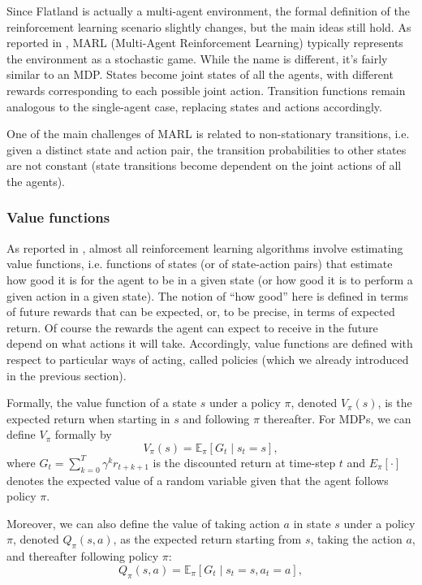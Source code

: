 \documentclass[a4paper,10pt]{report}
\begin{document}
Since Flatland is actually a multi-agent environment, the formal definition of the reinforcement learning scenario slightly changes, but the main ideas still hold. As reported in \cite{marl-medium}, MARL (Multi-Agent Reinforcement Learning) typically represents the environment as a stochastic game. While the name is different, it’s fairly similar to an MDP. States become joint states of all the agents, with different rewards corresponding to each possible joint action. Transition functions remain analogous to the single-agent case, replacing states and actions accordingly. 

One of the main challenges of MARL is related to non-stationary transitions, i.e. given a distinct state and action pair, the transition probabilities to other states are not constant (state transitions become dependent on the joint actions of all the agents).

\subsubsection*{Value functions}
As reported in \cite{sutton-barto}, almost all reinforcement learning algorithms involve estimating value functions, i.e. functions of states (or of state-action pairs) that estimate how good it is for the agent to be in a given state (or how good it is to perform a given action in a given state). The notion of “how good” here is defined in terms of future rewards that can be expected, or, to be precise, in terms of expected return. Of course the rewards the agent can expect to receive in the future depend on what actions it will take. Accordingly, value functions are defined with respect to particular ways of acting, called policies (which we already introduced in the previous section).

Formally, the value function of a state $s$ under a policy $\pi$, denoted $V_\pi(s)$, is the expected return when starting in $s$ and following $\pi$ thereafter. For MDPs, we can define $V_\pi$ formally by
$$
V_\pi(s) = \mathbb{E}_\pi\left[G_t\mid s_t=s\right],
$$
where $G_t=\sum_{k=0}^{T}\gamma^{k}r_{t+k+1}$ is the discounted return at time-step $t$ and $E_\pi[\cdot]$ denotes the expected value of a random variable given that the agent follows policy $\pi$.

Moreover, we can also define the value of taking action $a$ in state $s$ under a policy $\pi$, denoted $Q_\pi(s,a)$, as the expected return starting from $s$, taking the action $a$, and thereafter following policy $\pi$:
$$
Q_\pi(s, a) = \mathbb{E}_\pi\left[G_t\mid s_t=s, a_t=a\right],
$$
\end{document}

